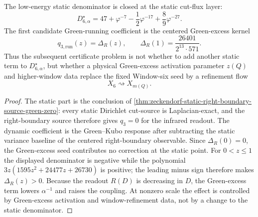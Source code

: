 







\begin{theorem}
\label{thm:zeckendorf-static-denominator-green-running-separation}
The low-energy static denominator is closed at the static cut-flux layer:
$$
  D_{6,\alpha}^{\star}
  =
  47+\varphi^{-7}-\frac12\varphi^{-17}
  +\frac89\varphi^{-27}.
$$
The first candidate Green-running coefficient is the centered
Green-excess kernel
$$
  q_{3,\mathrm{run}}(z)=\Delta_R(z),
  \qquad
  \Delta_R(1)=\frac{26401}{2^{13}\cdot571}.
$$
Thus the subsequent certificate problem is not whether to add another
static term to $D_{6,\alpha}^{\star}$, but whether a physical
Green-excess activation parameter $z(Q)$ and higher-window data replace
the fixed Window-six seed by a refinement flow
$$
  X_6\rightsquigarrow X_{m(Q)}.
$$
\end{theorem}
\begin{proof}
The static part is the conclusion of
\autoref{thm:zeckendorf-static-right-boundary-source-green-zero}: every
static Dirichlet cut-source is Laplacian-exact, and the right-boundary
source therefore gives $q_3=0$ for the infrared readout. The dynamic
coefficient is the Green--Kubo response after subtracting the static
variance baseline of the centered right-boundary observable. Since
$\Delta_R(0)=0$, the Green-excess seed contributes no correction at the
static point. For $0<z\leq1$ the displayed denominator is negative while
the polynomial $3z(1595z^2+24477z+26730)$ is positive; the leading minus
sign therefore makes $\Delta_R(z)>0$. Because the readout $R(D)$ is
decreasing in $D$, the Green-excess term lowers $\alpha^{-1}$ and raises
the coupling. At nonzero scale the effect is controlled by Green-excess
activation and window-refinement data, not by a change to the static
denominator.
\end{proof}

